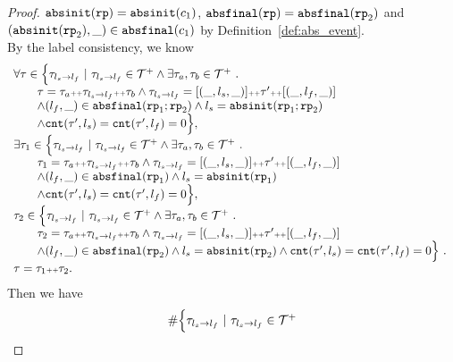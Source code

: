 \begin{proof}
$\mathtt{abs}{\mathtt{init}}(\mathtt{rp}) = \mathtt{abs}{\mathtt{init}}(c_1)$,
$\mathtt{abs}{\mathtt{final}}(\mathtt{rp}) = \mathtt{abs}{\mathtt{final}}(\mathtt{rp}_2)$ and $(\mathtt{abs}{\mathtt{init}}(\mathtt{rp}_2), \_) \in \mathtt{abs}{\mathtt{final}}(c_1)$
by Definition~\ref{def:abs_event}.
\\
By the label consistency, we know 
\[
  \begin{array}{l}
    \forall \mathtt{\tau} \in
    \Big\{\mathtt{\tau}_{l_s \to l_f} 
    ~\vert~ \mathtt{\tau}_{l_s \to l_f} \in \mathcal{T}^{+} 
    \land \exists \mathtt{\tau}_a, \mathtt{\tau}_b \in \mathcal{T}^{+}
    ~.~ 
    \\ \qquad
     \mathtt{\tau} = \mathtt{\tau}_a {\scriptscriptstyle ++} \mathtt{\tau}_{l_s \to l_f} {\scriptscriptstyle ++} \mathtt{\tau}_b
    \land \mathtt{\tau}_{l_s \to l_f} = [(\_, l_s, \_)] {\scriptscriptstyle ++} \mathtt{\tau}' {\scriptscriptstyle ++} [(\_, l_f, \_)]
    \\ \qquad
    \land (l_{f}, \_) \in \mathtt{abs}{\mathtt{final}}(\mathtt{rp}_1; \mathtt{rp}_2)
    \land l_s = \mathtt{abs}{\mathtt{init}}(\mathtt{rp}_1; \mathtt{rp}_2)
    \\ \qquad
    \land \mathtt{cnt}(\mathtt{\tau}', l_s) = \mathtt{cnt}(\mathtt{\tau}', l_f) = 0 
    \Big\},
    \\
    \exists \mathtt{\tau}_1 \in
    \Big\{\mathtt{\tau}_{l_s \to l_f} 
    ~\vert~ \mathtt{\tau}_{l_s \to l_f} \in \mathcal{T}^{+} 
    \land \exists \mathtt{\tau}_a, \mathtt{\tau}_b \in \mathcal{T}^{+}
    ~.~ 
    \\ \qquad
    \mathtt{\tau}_1 = \mathtt{\tau}_a {\scriptscriptstyle ++} \mathtt{\tau}_{l_s \to l_f} {\scriptscriptstyle ++} \mathtt{\tau}_b
    \land \mathtt{\tau}_{l_s \to l_f} = [(\_, l_s, \_)] {\scriptscriptstyle ++} \mathtt{\tau}' {\scriptscriptstyle ++} [(\_, l_f, \_)]
    \\ \qquad
    \land (l_{f}, \_) \in \mathtt{abs}{\mathtt{final}}(\mathtt{rp}_1)
    \land l_s = \mathtt{abs}{\mathtt{init}}(\mathtt{rp}_1)
    \\ \qquad
    \land \mathtt{cnt}(\mathtt{\tau}', l_s) = \mathtt{cnt}(\mathtt{\tau}', l_f) = 0 
    \Big\},
    \\
    \mathtt{\tau}_2 \in
    \Big\{\mathtt{\tau}_{l_s \to l_f}
    ~\vert~ \mathtt{\tau}_{l_s \to l_f} \in \mathcal{T}^{+} 
    \land \exists \mathtt{\tau}_a, \mathtt{\tau}_b \in \mathcal{T}^{+}
    ~.~ 
    \\ \qquad 
    \mathtt{\tau}_2 = \mathtt{\tau}_a {\scriptscriptstyle ++} \mathtt{\tau}_{l_s \to l_f} {\scriptscriptstyle ++} \mathtt{\tau}_b
    \land \mathtt{\tau}_{l_s \to l_f} = [(\_, l_s, \_)] {\scriptscriptstyle ++} \mathtt{\tau}' {\scriptscriptstyle ++} [(\_, l_f, \_)]
   \\ \qquad
   \land (l_{f}, \_) \in \mathtt{abs}{\mathtt{final}}(\mathtt{rp}_2)
   \land l_s = \mathtt{abs}{\mathtt{init}}(\mathtt{rp}_2)
   \land \mathtt{cnt}(\mathtt{\tau}', l_s) = \mathtt{cnt}(\mathtt{\tau}', l_f) = 0 
   \Big\} 
   ~.~ 
   \\
   \mathtt{\tau} = \mathtt{\tau}_1 {\scriptscriptstyle ++} \mathtt{\tau}_2.
    \end{array}
  \]
  Then we have
  \[
    \begin{array}{l}
      \# \Big\{\mathtt{\tau}_{l_s \to l_f} 
      ~\vert~ \mathtt{\tau}_{l_s \to l_f} \in \mathcal{T}^{+} 

\end{array}\]
\end{proof}
